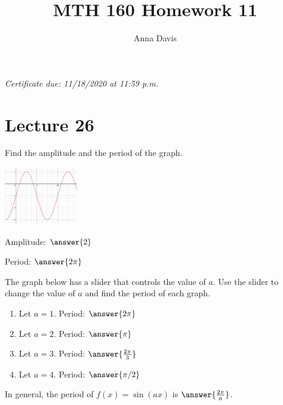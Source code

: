 \documentclass{ximera}
\author{Anna Davis} \title{MTH 160 Homework 11}
\begin{document}
\begin{abstract}

\end{abstract}
\maketitle
 \textit{Certificate due: 11/18/2020 at 11:59 p.m.}
  \section{Lecture 26}
  \begin{problem}\label{prob:160hom11prob2}
  Find the amplitude and the period of the graph.
  \begin{image}
   
\includegraphics[height=1in]{160H11pic2.jpg}~
 
\end{image}
Amplitude: $\answer{2}$

Period: $\answer{2\pi}$
  \end{problem}
  
 \begin{problem}\label{prob:160hom11prob3}  
 The graph below has a slider that controls the value of $a$.  Use the slider to change the value of $a$ and find the period of each graph.
  \begin{center} 
\end{center}
\begin{enumerate}
    \item Let $a=1$.  Period: $\answer{2\pi}$
    \item Let $a=2$.  Period: $\answer{\pi}$
    \item Let $a=3$.  Period: $\answer{\frac{2\pi}{3}}$
    \item Let $a=4$.  Period: $\answer{\pi/2}$
\end{enumerate}
In general, the period of $f(x)=\sin (ax)$ is $\answer{\frac{2\pi}{a}}$.
\end{problem}
\end{document}
